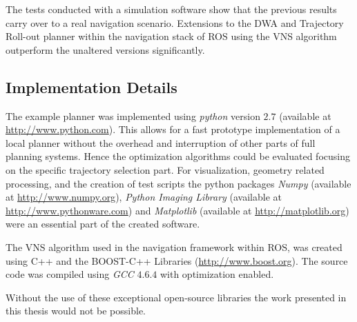 The tests conducted with a simulation software show that the previous results carry over to a real navigation scenario. Extensions to the DWA and Trajectory Roll-out planner within the navigation stack of ROS using the VNS algorithm outperform the unaltered versions significantly.

\subsection{Implementation Details}
The example planner was implemented using \emph{python} version $2.7$ (available at \url{http://www.python.com}). This allows for a fast prototype implementation of a local planner without the overhead and interruption of other parts of full planning systems.
Hence the optimization algorithms could be evaluated focusing on the  specific trajectory selection part. 
For visualization, geometry related processing, and the creation of test scripts the python packages \emph{Numpy} (available at \url{http://www.numpy.org}), \emph{Python Imaging Library} (available at \url{http://www.pythonware.com}) and \emph{Matplotlib} (available at \url{http://matplotlib.org}) were an essential part of the created software. 

The VNS algorithm used in the navigation framework within ROS, was created using C++ and the BOOST-C++ Libraries (\url{http://www.boost.org}).
The source code was compiled using \emph{GCC} $4.6.4$ with optimization enabled.

Without the use of these exceptional open-source libraries the work presented in this thesis would not be possible.  

 

